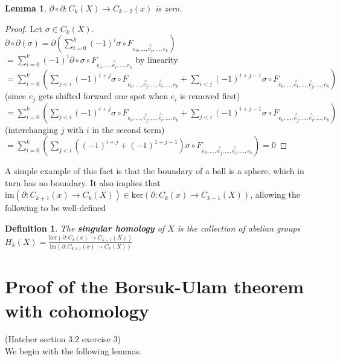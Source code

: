 \documentclass{article}
\newtheorem{definition}{Definition}
\newtheorem{lemma}{Lemma}
\begin{document}
\begin{lemma}
$\partial\circ\partial:C_k(X)\rightarrow C_{k-2}(x)$ is zero.
\end{lemma}
\begin{proof}
Let $\sigma\in C_k(X)$.\\
$\partial\circ\partial (\sigma)=\partial(\sum_{i=0}^k(-1)^i\sigma\circ F_{e_0,...,\overset{\wedge}{e_i},...,e_k})$\\
$=\sum_{i=0}^k(-1)^i\partial\circ\sigma\circ F_{e_0,...,\overset{\wedge}{e_i},...,e_k}$ by linearity\\
$=\sum_{i=0}^k(\sum_{j<i}(-1)^{i+j}\sigma\circ F_{e_0,...,\overset{\wedge}{e_j},...,\overset{\wedge}{e_i},...,e_k} + \sum_{i<j}(-1)^{i+j-1}\sigma\circ F_{e_0,...,\overset{\wedge}{e_i},...,\overset{\wedge}{e_j},...,e_k})$ (since $e_j$ gets shifted forward one spot when $e_i$ is removed first)\\
$=\sum_{i=0}^k(\sum_{j<i}(-1)^{i+j}\sigma\circ F_{e_0,...,\overset{\wedge}{e_j},...,\overset{\wedge}{e_i},...,e_k} + \sum_{j<i}(-1)^{i+j-1}\sigma\circ F_{e_0,...,\overset{\wedge}{e_j},...,\overset{\wedge}{e_i},...,e_k})$
(interchanging $j$ with $i$ in the second term)\\
$=\sum_{i=0}^k(\sum_{j<i}((-1)^{i+j}+(-1)^{1+j-1})\sigma\circ F_{e_0,...,\overset{\wedge}{e_j},...,\overset{\wedge}{e_i},...,e_k})=0$
\end{proof}

\noindent A simple example of this fact is that the boundary of a ball is a sphere, which in turn has no boundary. It also implies that \\$\text{im}(\partial:C_{k+1}(x)\rightarrow C_k(X))\in\text{ker}(\partial:C_{k}(x)\rightarrow C_{k-1}(X))$,
allowing the following to be well-defined
\begin{definition}
The \textbf{singular homology} of $X$ is the collection of abelian groups
$H_k(X)=\frac{\text{ker}(\partial:C_{k}(x)\rightarrow C_{k-1}(X))}{\text{im}(\partial:C_{k+1}(x)\rightarrow C_k(X))}$
\end{definition}

\section{Proof of the Borsuk-Ulam theorem with cohomology}

\textrm{(Hatcher section 3.2 exercise 3) \\}
We begin with the following lemmas.
\end{document}
